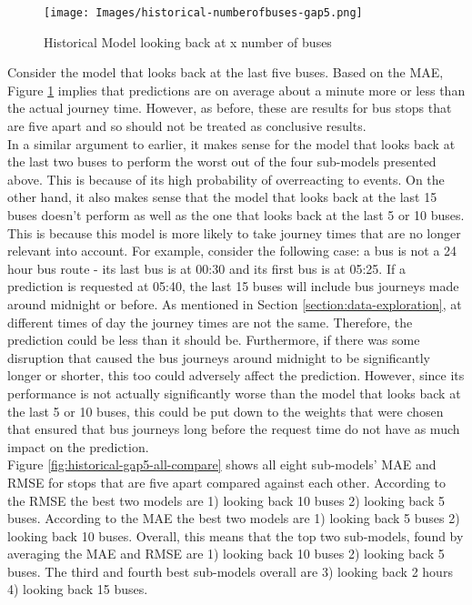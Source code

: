 \begin{figure}[H]
\begin{center}
    \texttt{[image: Images/historical-numberofbuses-gap5.png]}
    \caption{Historical Model looking back at x number of buses}
    \label{fig:historical-lookingbackbuses}
\end{center}
\end{figure}

Consider the model that looks back at the last five buses. Based on the MAE, Figure \ref{fig:historical-lookingbackbuses} implies that predictions are on average about a minute more or less than the actual journey time. However, as before, these are results for bus stops that are five apart and so should not be treated as conclusive results. \\

In a similar argument to earlier, it makes sense for the model that looks back at the last two buses to perform the worst out of the four sub-models presented above. This is because of its high probability of overreacting to events. On the other hand, it also makes sense that the model that looks back at the last 15 buses doesn't perform as well as the one that looks back at the last 5 or 10 buses. This is because this model is more likely to take journey times that are no longer relevant into account. For example, consider the following case: a bus is not a 24 hour bus route - its last bus is at 00:30 and its first bus is at 05:25. If a prediction is requested at 05:40, the last 15 buses will include bus journeys made around midnight or before. As mentioned in Section \ref{section:data-exploration}, at different times of day the journey times are not the same. Therefore, the prediction could be less than it should be. Furthermore, if there was some disruption that caused the bus journeys around midnight to be significantly longer or shorter, this too could adversely affect the prediction. However, since its performance is not actually significantly worse than the model that looks back at the last 5 or 10 buses, this could be put down to the weights that were chosen that ensured that bus journeys long before the request time do not have as much impact on the prediction. \\

Figure \ref{fig:historical-gap5-all-compare} shows all eight sub-models' MAE and RMSE for stops that are five apart compared against each other. According to the RMSE the best two models are 1) looking back 10 buses 2) looking back 5 buses. According to the MAE the best two models are 1) looking back 5 buses 2) looking back 10 buses. Overall, this means that the top two sub-models, found by averaging the MAE and RMSE are 1) looking back 10 buses 2) looking back 5 buses. The third and fourth best sub-models overall are 3) looking back 2 hours 4) looking back 15 buses. 

